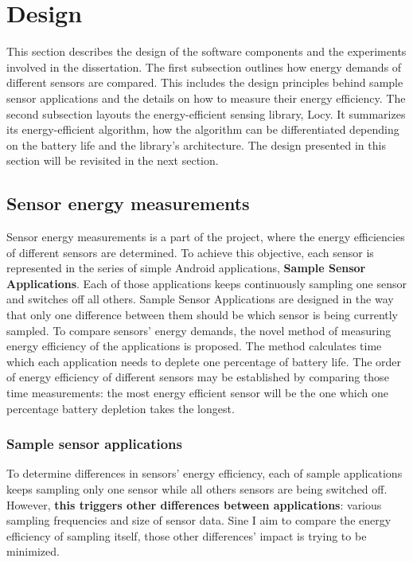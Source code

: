\section{Design}
\label{s:design}
\hspace{10pt} This section describes the design of the software components and the experiments involved in the dissertation. The first subsection outlines how energy demands of different sensors are compared. This includes the design principles behind sample sensor applications and the details on how to measure their energy efficiency. The second subsection layouts the energy-efficient sensing library, Locy. It summarizes its energy-efficient algorithm, how the algorithm can be differentiated depending on the battery life and the library's architecture. The design presented in this section will be revisited in the next section.

\subsection{Sensor energy measurements}
\label{s:design:measurements}
\hspace{10pt} Sensor energy measurements is a part of the project, where the energy efficiencies of different sensors are determined. To achieve this objective, each sensor is represented in the series of simple Android applications, \textbf{Sample Sensor Applications}. Each of those applications keeps continuously sampling one sensor and switches off all others. Sample Sensor Applications are designed in the way that only one difference between them should be which sensor is being currently sampled. To compare sensors' energy demands, the novel method of measuring energy efficiency of the applications is proposed. The method calculates time which each application needs to deplete one percentage of battery life. The order of energy efficiency of different sensors may be established by comparing those time measurements: the most energy efficient sensor will be the one which one percentage battery depletion takes the longest. 

\subsubsection{Sample sensor applications}
\label{s:design:measurements:sampleapps}
\hspace{10pt} To determine differences in sensors' energy efficiency, each of sample applications keeps sampling only one sensor while all others sensors are being switched off.  However, \textbf{this triggers other differences between applications}: various sampling frequencies and size of sensor data. Sine I aim to compare the energy efficiency of sampling itself, those other differences' impact is trying to be minimized. 

